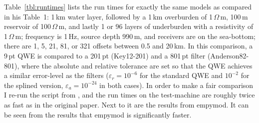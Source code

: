 \documentclass[manuscript,revised]{geophysics}
\begin{document}
Table~\ref{tbl:runtimes} lists the run times for exactly the same models as
\cite{GEO.12.Key} compared in his Table~1: 1\,km water layer, followed by a
1\,km overburden of 1\,$\Omega\,$m, 100\,m reservoir of 100\,$\Omega\,$m, and
lastly 1 or 96 layers of underburden with a resistivity of 1\,$\Omega\,$m;
frequency is 1\,Hz, source depth 990\,m, and receivers are on the sea-bottom;
there are 1, 5, 21, 81, or 321 offsets between 0.5 and 20\,km. In this
comparison, a 9\,pt QWE is compared to a 201\,pt (Key12-201) and a 801\,pt
filter (Anderson82-801), where the absolute and relative tolerance are set so
that the QWE achieves a similar error-level as the filters ($\varepsilon_r =
10^{-6}$ for the standard QWE and $10^{-2}$ for the splined version,
$\varepsilon_a = 10^{-24}$ in both cases). In order to make a fair comparison I
re-run the script from \cite{GEO.12.Key}, and the run times on the test-machine
are roughly twice as fast as in the original paper. Next to it are the results
from empymod. It can be seen from the results that empymod is significantly
faster.%
%
%
\end{document}
